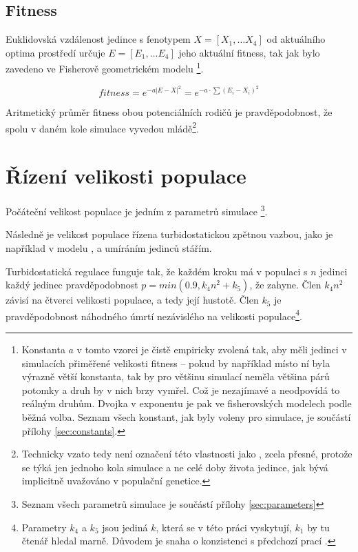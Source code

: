 \subsection{Fitness}

Euklidovská vzdálenost jedince s fenotypem $X = [X_1,\dots{}X_4]$ od aktuálního optima prostředí určuje
$E = [E_1,\dots{} E_4]$ jeho aktuální fitness, tak jak bylo zavedeno ve Fisherově geometrickém modelu
\citep{tenaillon2014utility}\footnote{
Konstanta $a$ v tomto vzorci je čistě empiricky zvolená tak, aby měli jedinci v simulacích
přiměřené velikosti fitness -- pokud by například místo ní byla výrazně větší konstanta, tak by pro většinu simulací
neměla většina párů potomky a druh by v nich brzy vymřel. Což je nezajímavé a neodpovídá to reálným druhům.
Dvojka v exponentu je pak ve fisherovských modelech podle \citet{tenaillon2014utility} běžná volba.
Seznam všech konstant, jak byly voleny pro simulace, je součástí přílohy \ref{sec:constants}.
}.

\begin{equation}
fitness = e^{-a |E-X|^2} = e^{-a\cdot{\sum{(E_i - X_i)^2}}}
\end{equation}

Aritmetický průměr fitness obou potenciálních rodičů je pravděpodobnost, že spolu v daném kole simulace vyvedou
mládě\footnote{Technicky vzato tedy není označení této vlastnosti jako , zcela přesné, protože se týká
jen jednoho kola simulace a ne celé doby života jedince, jak bývá implicitně uvažováno v populační genetice.}.

\section{Řízení velikosti populace}

Počáteční velikost populace je jedním z parametrů simulace
\footnote{Seznam všech parametrů simulace je součástí přílohy \ref{sec:parameters}}.

Následně je velikost populace řízena turbidostatickou
zpětnou vazbou, jako je například v modelu \citet{Flegr139030}, a umíráním jedinců stářím.

Turbidostatická regulace funguje tak, že každém kroku má v populaci s $n$ jedinci každý jedinec pravděpodobnost
$p = min(0.9, k_4 n^2 + k_5)$, že zahyne. Člen $k_4 n^2$ závisí na čtverci velikosti populace, a tedy její hustotě.
Člen $k_5$ je pravděpodobnost náhodného úmrtí nezávislého na velikosti populace\footnote{
   Parametry $k_4$ a $k_5$ jsou jediná $k$, která se v této práci vyskytují, $k_1$ by tu čtenář hledal marně. Důvodem je
   snaha o konzistenci s předchozí prací \citet{Flegr139030}.
}.


